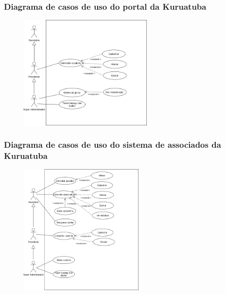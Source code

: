\documentclass{beamer}
\begin{document}
\begin{frame}
    \frametitle{Diagrama de casos de uso do portal da Kuruatuba}
    \begin{figure}[htb]
        \centering
        
        \includegraphics[width=0.6\textwidth]{figuras/use-case-portal-2.png}
        
        \label{use-case-portal}
    \end{figure}
\end{frame}

\begin{frame}
    \frametitle{Diagrama de casos de uso do sistema de associados da Kuruatuba}
    \begin{figure}[htb]
        \centering
        \includegraphics[width=0.56\textwidth]{../figuras/use-case-sistema.png}
        
        \label{use-case-sistema}
    \end{figure}
\end{frame}
\end{document}
